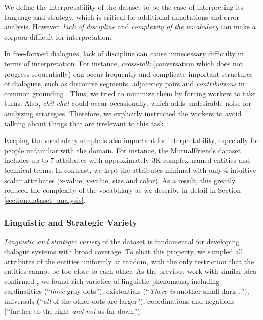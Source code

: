 \documentclass[letterpaper]{article}
\newcommand{\utterance}[1]{``#1''}
\begin{document}
We define the interpretability of the dataset to be the ease of interpreting its language and strategy, which is critical for additional annotations and error analysis. However, \emph{lack of discipline} and \emph{complexity of the vocabulary} can make a corpora difficult for interpretation.

In free-formed dialogues, lack of discipline can cause unnecessary difficulty in terms of interpretation. For instance, \emph{cross-talk} (conversation which does not progress sequentially) can occur frequently \cite{he2017learning} and complicate important structures of dialogues, such as discourse segments, adjacency pairs and \emph{contributions} in common grounding \cite{clark1996using}. Thus, we tried to minimize them by forcing workers to take turns. Also, \emph{chit-chat} could occur occasionally, which adds undesirable noise for analyzing strategies. Therefore, we explicitly instructed the workers to avoid talking about things that are irrelevant to this task.

Keeping the vocabulary simple is also important for interpretability, especially for people unfamiliar with the domain. For instance, the MutualFriends dataset \cite{he2017learning} includes up to 7 attributes with approximately 3K complex named entities and technical terms. In contrast, we kept the attributes minimal with only 4 intuitive scalar attributes (x-value, y-value, size and color). As a result, this greatly reduced the complexity of the vocabulary as we describe in detail in Section \ref{section:dataset_analysis}.

\subsubsection{Linguistic and Strategic Variety}

\emph{Linguistic and strategic variety} of the dataset is fundamental for developing dialogue systems with broad coverage. To elicit this property, we sampled all attributes of the entities uniformly at random, with the only restriction that the entities cannot be too close to each other. As the previous work with similar idea confirmed \cite{suhr2017corpus}, we found rich varieties of linguistic phenomena, including cardinalities (\utterance{\textit{three} gray dots}), existentials (\utterance{\textit{There is} another small dark ..}), universals (\utterance{\textit{all} of the other dots are larger}), coordinations and negations (\utterance{further to the right \textit{and} \textit{not} as far down}).
\end{document}
